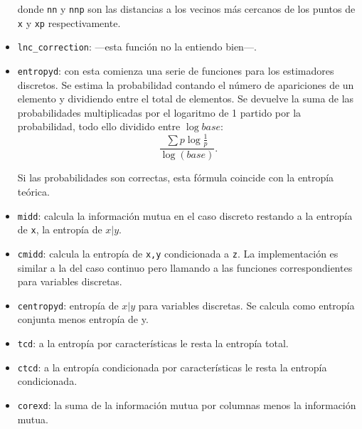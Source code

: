 \documentclass[12pt,a4paper]{report} %
\theoremstyle{definition}
\begin{document}
\begin{itemize}
donde \texttt{nn} y \texttt{nnp} son las distancias a los vecinos más cercanos de los puntos de \texttt{x} y \texttt{xp} respectivamente.

\item \texttt{lnc\_correction}: ---esta función no la entiendo bien---.

\item \texttt{entropyd}: con esta comienza una serie de funciones para los estimadores discretos. Se estima la probabilidad contando el número de apariciones de un elemento y dividiendo entre el total de elementos. Se devuelve la suma de las probabilidades multiplicadas por el logaritmo de 1 partido por la probabilidad, todo ello dividido entre $\log base$:\[
\frac{\sum p \log \frac{1}{p}}{\log(base)}.
\]

Si las probabilidades son correctas, esta fórmula coincide con la entropía teórica.

\item \texttt{midd}: calcula la información mutua en el caso discreto restando a la entropía de \texttt{x}, la entropía de $x|y$.

\item \texttt{cmidd}: calcula la entropía de \texttt{x,y} condicionada a \texttt{z}. La implementación es similar a la del caso continuo pero llamando a las funciones correspondientes para variables discretas.

\item \texttt{centropyd}: entropía de $x|y$ para variables discretas. Se calcula como entropía conjunta menos entropía de y.

\item \texttt{tcd}: a la entropía por características le resta la entropía total.

\item \texttt{ctcd}:  a la entropía condicionada por características le resta la entropía condicionada.

\item \texttt{corexd}: la suma de la información mutua por columnas menos la información mutua.


\end{itemize}
\end{document}
